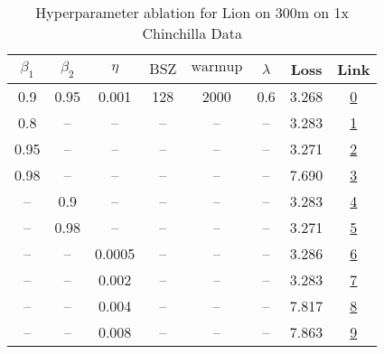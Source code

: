 \begin{table}[H]
\centering
\caption{Hyperparameter ablation for Lion on 300m on 1x Chinchilla Data}
\label{tab:ablation_lion_300m_1}
\begin{tabular}{cccccccc}
\toprule
$\beta_1$ & $\beta_2$ & $\eta$ & $\mathrm{BSZ}$ & $\mathrm{warmup}$ & $\lambda$ & Loss & Link \\
\midrule
0.9 & 0.95 & 0.001 & 128 & 2000 & 0.6 & 3.268 & \href{https://wandb.ai/stanford-mercury/optimizer-scaling/runs/sweep-300m-6B-lion00979clr0.001-wd0.6-minlr0-warmup2000-b10.9-b2-81fdf3}{0} \\
\midrule
0.8 & -- & -- & -- & -- & -- & 3.283 & \href{https://wandb.ai/stanford-mercury/optimizer-scaling/runs/sweep-300m-6B-lionb6c8celr0.001-wd0.6-minlr0-warmup2000-b10.8-b2-b954bf}{1} \\
0.95 & -- & -- & -- & -- & -- & 3.271 & \href{https://wandb.ai/stanford-mercury/optimizer-scaling/runs/sweep-300m-6B-lion11c981lr0.001-wd0.6-minlr0-warmup2000-b10.95-b-4fef8e}{2} \\
0.98 & -- & -- & -- & -- & -- & 7.690 & \href{https://wandb.ai/stanford-mercury/optimizer-scaling/runs/sweep-300m-6B-lion5c8de5lr0.001-wd0.6-minlr0-warmup2000-b10.98-b-1d6304}{3} \\
-- & 0.9 & -- & -- & -- & -- & 3.283 & \href{https://wandb.ai/stanford-mercury/optimizer-scaling/runs/sweep-300m-6B-lionf81910lr0.001-wd0.6-minlr0-warmup2000-b10.9-b2-3a8ce5}{4} \\
-- & 0.98 & -- & -- & -- & -- & 3.271 & \href{https://wandb.ai/stanford-mercury/optimizer-scaling/runs/sweep-300m-6B-lion062393lr0.001-wd0.6-minlr0-warmup2000-b10.9-b2-aaa1ff}{5} \\
-- & -- & 0.0005 & -- & -- & -- & 3.286 & \href{https://wandb.ai/stanford-mercury/optimizer-scaling/runs/sweep-300m-6B-lionfb90dflr0.0005-wd0.6-minlr0-warmup2000-b10.9-b-8dee1b}{6} \\
-- & -- & 0.002 & -- & -- & -- & 3.283 & \href{https://wandb.ai/stanford-mercury/optimizer-scaling/runs/sweep-300m-6B-lion009506lr0.002-wd0.6-minlr0-warmup2000-b10.9-b2-9aa797}{7} \\
-- & -- & 0.004 & -- & -- & -- & 7.817 & \href{https://wandb.ai/stanford-mercury/optimizer-scaling/runs/sweep-300m-6B-lionfef5c5lr0.004-wd0.6-minlr0-warmup2000-b10.9-b2-2cf0da}{8} \\
-- & -- & 0.008 & -- & -- & -- & 7.863 & \href{https://wandb.ai/stanford-mercury/optimizer-scaling/runs/sweep-300m-6B-lion617912lr0.008-wd0.6-minlr0-warmup2000-b10.9-b2-9c49d8}{9} \\

\end{tabular}
\end{table}
